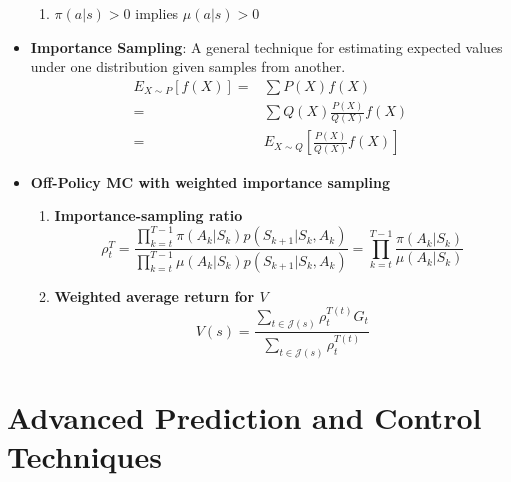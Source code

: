 \documentclass[a4paper]{article}
\begin{document}
\begin{itemize}
\begin{enumerate}
        \item $\pi(a|s)>0$ implies $\mu(a|s)>0$
    \end{enumerate}
    \item \textbf{Importance Sampling}: A general technique for estimating expected values under one distribution given samples from another.
    \begin{equation*}
        \begin{split}
            E_{X\sim P}[f(X)]=&\sum P(X)f(X)\\
            =&\sum Q(X)\frac{P(X)}{Q(X)}f(X)\\
            =&E_{X\sim Q}[\frac{P(X)}{Q(X)}f(X)]
        \end{split}
    \end{equation*}
    \item \textbf{Off-Policy MC with weighted importance sampling}
    \begin{enumerate}
        \item \textbf{Importance-sampling ratio}
        \begin{equation*}
            \rho_t^T=\frac{\prod_{k=t}^{T-1}\pi(A_k|S_k)p(S_{k+1}|S_k,A_k)}{\prod_{k=t}^{T-1}\mu(A_k|S_k)p(S_{k+1}|S_k,A_k)}=\prod_{k=t}^{T-1}\frac{\pi(A_k|S_k)}{\mu(A_k|S_k)}
        \end{equation*}
        \item \textbf{Weighted average return for $V$}
        \begin{equation*}
            V(s)=\frac{\sum_{t\in \mathcal{J}(s)}\rho_t^{T(t)}G_t}{\sum_{t\in \mathcal{J}(s)}\rho_t^{T(t)}}
        \end{equation*}
    \end{enumerate}
\end{itemize}

\section{Advanced Prediction and Control Techniques}
\end{document}
